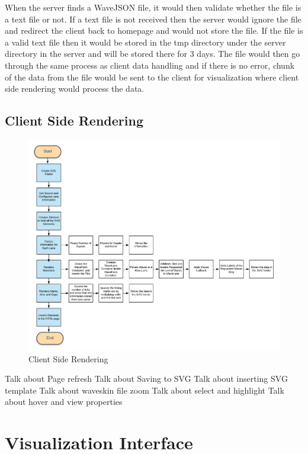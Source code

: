 \documentclass[14pt]{extarticle}
\begin{document}
\par When the server finds a WaveJSON file, it would then validate whether the file is a text file or not. If a text file is not received then the server would ignore the file and redirect the client back to homepage and would not store the file. If the file is a valid text file then it would be stored in the tmp directory under the server directory in the server and will be stored there for 3 days. The file would then go through the same process as client data handling and if there is no error, chunk of the data from the file would be sent to the client for visualization where client side rendering would process the data.


\subsection{Client Side Rendering}
\begin{figure}[H]
    \centering
    \includegraphics[scale=0.23]{render}
    \caption{Client Side Rendering}
    \label{fig:Client Side Rendering}
\end{figure}
Talk about Page refresh
Talk about Saving to SVG
Talk about inserting SVG template
Talk about waveskin file zoom
Talk about select and highlight
Talk about hover and view properties


\newpage
\section{Visualization Interface}
\end{document}
